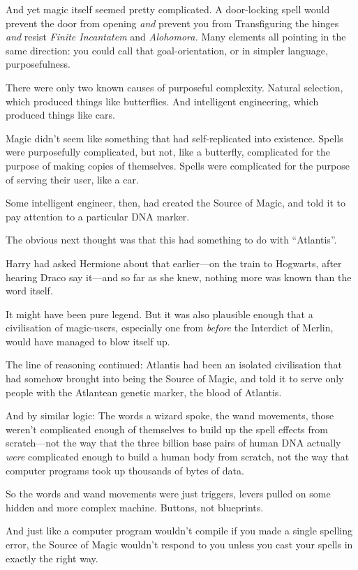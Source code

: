 And yet magic itself seemed pretty complicated. A door-locking spell
would prevent the door from opening \emph{and} prevent you from
Transfiguring the hinges \emph{and} resist \emph{Finite Incantatem} and
\emph{Alohomora.} Many elements all pointing in the same direction: you
could call that goal-orientation, or in simpler language,
purposefulness.

There were only two known causes of purposeful complexity. Natural
selection, which produced things like butterflies. And intelligent
engineering, which produced things like cars.

Magic didn't seem like something that had self-replicated into
existence. Spells were purposefully complicated, but not, like a
butterfly, complicated for the purpose of making copies of themselves.
Spells were complicated for the purpose of serving their user, like a
car.

Some intelligent engineer, then, had created the Source of Magic, and
told it to pay attention to a particular DNA marker.

The obvious next thought was that this had something to do with
``Atlantis''.

Harry had asked Hermione about that earlier---on the train to Hogwarts,
after hearing Draco say it---and so far as she knew, nothing more was
known than the word itself.

It might have been pure legend. But it was also plausible enough that a
civilisation of magic-users, especially one from \emph{before} the
Interdict of Merlin, would have managed to blow itself up.

The line of reasoning continued: Atlantis had been an isolated
civilisation that had somehow brought into being the Source of Magic,
and told it to serve only people with the Atlantean genetic marker, the
blood of Atlantis.

And by similar logic: The words a wizard spoke, the wand movements,
those weren't complicated enough of themselves to build up the spell
effects from scratch---not the way that the three billion base pairs of
human DNA actually \emph{were} complicated enough to build a human body
from scratch, not the way that computer programs took up thousands of
bytes of data.

So the words and wand movements were just triggers, levers pulled on
some hidden and more complex machine. Buttons, not blueprints.

And just like a computer program wouldn't compile if you made a single
spelling error, the Source of Magic wouldn't respond to you unless you
cast your spells in exactly the right way.

